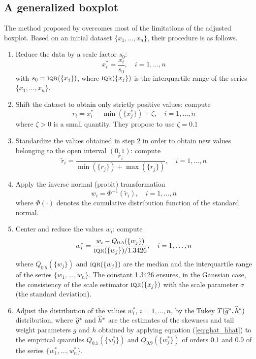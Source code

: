 \subsection{A generalized boxplot}

The method proposed by \citet{Bruffaerts:etal:2014} overcomes most of the
limitations of the adjusted boxplot. Based on an initial 
dataset $\{x_1, \dots, x_n\}$, their procedure is as follows. 

\begin{enumerate}
    \item Reduce the data by a scale factor $s_0$:
    \[
        x^*_i = \frac{x_i}{s_0}, \quad i= 1, \dots, n
    \]
    with $s_0 = \stsc{IQR}(\{x_j\})$, where $\stsc{IQR}(\{x_j\})$ is the
    interquartile range of the series $\{x_1, \dots, x_n\}$.

    \item Shift the dataset to obtain only strictly positive values: compute
    \[
        r_i = x^*_i - \min(\{x^*_j\}) + \zeta, \quad i= 1, \dots, n
    \]
    where $\zeta > 0$ is a small quantity. They propose to use $\zeta = 0.1$

    \item Standardize the values obtained in step 2 in order to obtain new values
    belonging to the open interval $(0,1)$: compute
    \[
        \widetilde{r}_i = \frac{r_i}{\min(\{r_j\})+ \max(\{r_j\})}, \quad i= 1, \dots, n
    \]

    \item Apply the inverse normal (probit) transformation
    \[
        w_i  =\Phi^{-1}(\widetilde{r}_i), \quad i= 1, \dots, n
    \]
     where $\Phi(\cdot)$ denotes the cumulative distribution
     function of the standard normal.

     \item Center and reduce the values $w_i$: compute
     \[
         w^*_i = \frac{w_i - Q_{0.5}(\{w_j\})}{\stsc{IQR}(\{w_j\})/1.3426}, 
         \quad i= 1, \dots, n
     \]
    where $Q_{0.5}(\{w_j\})$ and $\stsc{IQR}(\{w_j\})$ are the median and the
    interquartile range of the series $\{w_1,\dots, w_n\}$. The constant 1.3426
    ensures, in the Gaussian case, the consistency of the scale estimator
    $\stsc{IQR}(\{x_j\})$ with the scale parameter $\sigma$ (the standard
    deviation).

    \item Adjust the distribution of the values $w^*_i$, $i = 1, \dots, n$, by  
    the Tukey $T(\widehat{g}^*,\widehat{h}^*)$ distribution, where $\widehat{g}^*$
    and $\widehat{h}^*$ are the estimates of the skewness and tail weight
    parameters $g$ and $h$ obtained by applying equation (\ref{eq:ghat_hhat})
    to the empirical quantiles $Q_{0.1}(\{w^*_j\})$ and $Q_{0.9}(\{w^*_j\})$ of
    orders 0.1 and 0.9 of the series $\{w^*_1, \dots, w^*_n\}$.


\end{enumerate}
